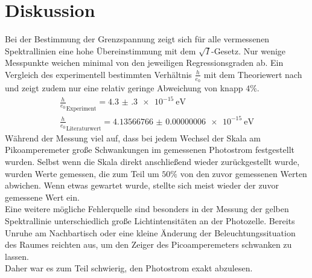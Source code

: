 \section{Diskussion}
\label{sec:Diskussion}
Bei der Bestimmung der Grenzspannung zeigt sich für alle vermessenen Spektrallinien eine hohe Übereinstimmung mit dem $\sqrt{I}$-Gesetz. Nur wenige Messpunkte weichen minimal von den jeweiligen Regressionsgraden ab.
Ein Vergleich des experimentell bestimmten Verhältnis $\frac{h}{e_0}$ mit dem Theoriewert nach \cite{h} und \cite{e} zeigt zudem nur eine relativ geringe Abweichung von knapp $4\%$.
\begin{gather*}
  {\frac{h}{e_0}}_\mathrm{Experiment}=\SI{4.3(3)e-15}{\electronvolt}\\
  {\frac{h}{e_0}}_\mathrm{Literaturwert}=\SI{4.13566766(6)e-15}{\electronvolt}
\end{gather*}
Während der Messung viel auf, dass bei jedem Wechsel der Skala am Pikoamperemeter große Schwankungen im gemessenen Photostrom festgestellt wurden. Selbst wenn die Skala direkt anschließend wieder zurückgestellt wurde, wurden Werte gemessen, die zum Teil um $50\%$ von den zuvor gemessenen Werten abwichen. Wenn etwas gewartet wurde, stellte sich meist wieder der zuvor gemessene Wert ein.\\
Eine weitere mögliche Fehlerquelle sind besonders in der Messung der gelben Spektrallinie unterschiedlich große Lichtintensitäten an der Photozelle. Bereits Unruhe am Nachbartisch oder eine kleine Änderung der Beleuchtungssituation des Raumes reichten aus, um den Zeiger des Picoamperemeters schwanken zu lassen.\\
Daher war es zum Teil schwierig, den Photostrom exakt abzulesen.
